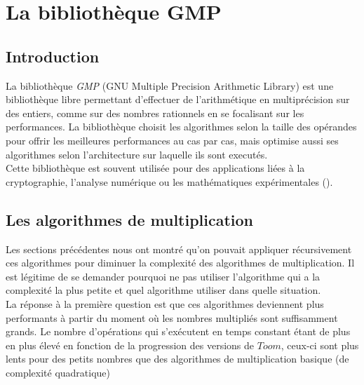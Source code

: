 \documentclass[letterpaper]{article}
\begin{document}


\section{La bibliothèque GMP}

\subsection{Introduction}

La bibliothèque \emph{GMP} (GNU Multiple Precision Arithmetic Library) est une
bibliothèque libre permettant d'effectuer de l'arithmétique en multiprécision sur
des entiers, comme sur des nombres rationnels en se focalisant sur les
performances. La bibliothèque choisit les algorithmes selon la taille des
opérandes pour offrir les meilleures performances au cas par cas, mais optimise
aussi ses algorithmes selon l'architecture sur laquelle ils sont executés.\\

Cette bibliothèque est souvent utilisée pour des applications liées à la
cryptographie, l'analyse numérique ou les mathématiques expérimentales
(\cite{wikigmp}).

\subsection{Les algorithmes de multiplication}

Les sections précédentes nous ont montré qu'on pouvait appliquer récursivement
ces algorithmes pour diminuer la complexité des algorithmes de multiplication.
Il est légitime de se demander pourquoi ne pas utiliser l'algorithme
qui a la complexité la plus petite et quel algorithme utiliser dans
quelle situation.\\

La réponse à la première question est que ces algorithmes deviennent
plus performants à partir du moment où les nombres multipliés sont
suffisamment grands. Le nombre d'opérations qui s'exécutent en temps constant
étant de plus en plus élevé en fonction de la progression des versions de $Toom$,
ceux-ci sont plus lents pour des petits nombres que des algorithmes de
multiplication basique (de complexité quadratique)\\
\end{document}
